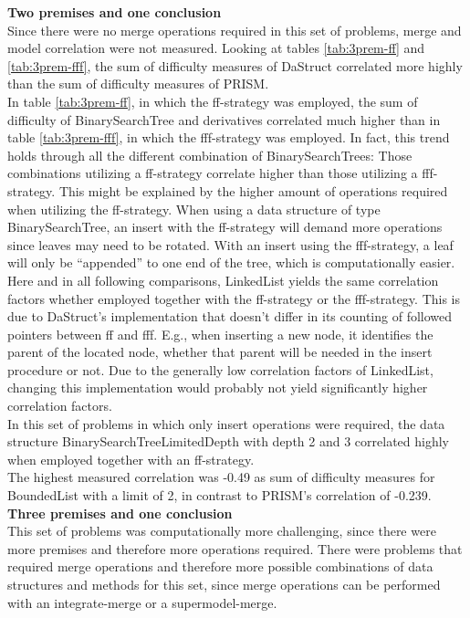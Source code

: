 \documentclass[hidelinks]{scrartcl}
\begin{document}
\textbf{Two premises and one conclusion} \\
Since there were no merge operations required in this set of problems, merge and model correlation were not measured. Looking at tables \ref{tab:3prem-ff} and \ref{tab:3prem-fff}, the sum of difficulty measures of DaStruct correlated more highly than the sum of difficulty measures of PRISM. \\
In table \ref{tab:3prem-ff}, in which the ff-strategy was employed, the sum of difficulty of BinarySearchTree and derivatives correlated much higher than in table \ref{tab:3prem-fff}, in which the fff-strategy was employed. In fact, this trend holds through all the different combination of BinarySearchTrees: Those combinations utilizing a ff-strategy correlate higher than those utilizing a fff-strategy. This might be explained by the higher amount of operations required when utilizing the ff-strategy. When using a data structure of type BinarySearchTree, an insert with the ff-strategy will demand more operations since leaves may need to be rotated. With an insert using the fff-strategy, a leaf will only be ``appended'' to one end of the tree, which is computationally easier. \\
Here and in all following comparisons, LinkedList yields the same correlation factors whether employed together with the ff-strategy or the fff-strategy. This is due to DaStruct's implementation that doesn't differ in its counting of followed pointers between ff and fff. E.g., when inserting a new node, it identifies the parent of the located node, whether that parent will be needed in the insert procedure or not. Due to the generally low correlation factors of LinkedList, changing this implementation would probably not yield significantly higher correlation factors. \\
In this set of problems in which only insert operations were required, the data structure BinarySearchTreeLimitedDepth with depth 2 and 3 correlated highly when employed together with an ff-strategy. \\
The highest measured correlation was -0.49 as sum of difficulty measures for BoundedList with a limit of 2, in contrast to PRISM's correlation of -0.239.  \\

\textbf{Three premises and one conclusion} \\
This set of problems was computationally more challenging, since there were more premises and therefore more operations required. There were problems that required merge operations and therefore more possible combinations of data structures and methods for this set, since merge operations can be performed with an integrate-merge or a supermodel-merge. \\
\end{document}
